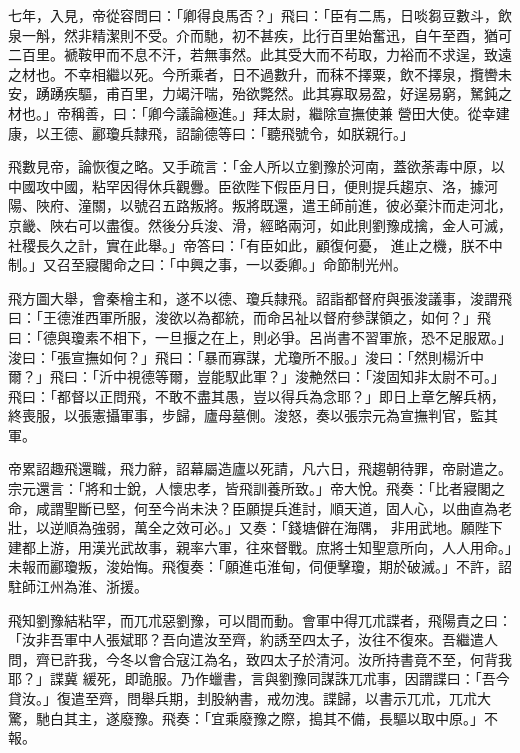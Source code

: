 \begin{pinyinscope}
 七年，入見，帝從容問曰：「卿得良馬否？」飛曰：「臣有二馬，日啖芻豆數斗，飲泉一斛，然非精潔則不受。介而馳，初不甚疾，比行百里始奮迅，自午至酉，猶可二百里。褫鞍甲而不息不汗，若無事然。此其受大而不茍取，力裕而不求逞，致遠之材也。不幸相繼以死。今所乘者，日不過數升，而秣不擇粟，飲不擇泉，攬轡未安，踴踴疾驅，甫百里，力竭汗喘，殆欲斃然。此其寡取易盈，好逞易窮，駑鈍之材也。」帝稱善，曰：「卿今議論極進。」拜太尉，繼除宣撫使兼
 營田大使。從幸建康，以王德、酈瓊兵隸飛，詔諭德等曰：「聽飛號令，如朕親行。」



 飛數見帝，論恢復之略。又手疏言：「金人所以立劉豫於河南，蓋欲荼毒中原，以中國攻中國，粘罕因得休兵觀釁。臣欲陛下假臣月日，便則提兵趨京、洛，據河陽、陜府、潼關，以號召五路叛將。叛將既還，遣王師前進，彼必棄汴而走河北，京畿、陜右可以盡復。然後分兵浚、滑，經略兩河，如此則劉豫成擒，金人可滅，社稷長久之計，實在此舉。」帝答曰：「有臣如此，顧復何憂，
 進止之機，朕不中制。」又召至寢閣命之曰：「中興之事，一以委卿。」命節制光州。



 飛方圖大舉，會秦檜主和，遂不以德、瓊兵隸飛。詔詣都督府與張浚議事，浚謂飛曰：「王德淮西軍所服，浚欲以為都統，而命呂祉以督府參謀領之，如何？」飛曰：「德與瓊素不相下，一旦揠之在上，則必爭。呂尚書不習軍旅，恐不足服眾。」浚曰：「張宣撫如何？」飛曰：「暴而寡謀，尤瓊所不服。」浚曰：「然則楊沂中爾？」飛曰：「沂中視德等爾，豈能馭此軍？」浚艴然曰：「浚固知非太尉不可。」
 飛曰：「都督以正問飛，不敢不盡其愚，豈以得兵為念耶？」即日上章乞解兵柄，終喪服，以張憲攝軍事，步歸，廬母墓側。浚怒，奏以張宗元為宣撫判官，監其軍。



 帝累詔趣飛還職，飛力辭，詔幕屬造廬以死請，凡六日，飛趨朝待罪，帝尉遣之。宗元還言：「將和士銳，人懷忠孝，皆飛訓養所致。」帝大悅。飛奏：「比者寢閣之命，咸謂聖斷已堅，何至今尚未決？臣願提兵進討，順天道，固人心，以曲直為老壯，以逆順為強弱，萬全之效可必。」又奏：「錢塘僻在海隅，
 非用武地。願陛下建都上游，用漢光武故事，親率六軍，往來督戰。庶將士知聖意所向，人人用命。」未報而酈瓊叛，浚始悔。飛復奏：「願進屯淮甸，伺便擊瓊，期於破滅。」不許，詔駐師江州為淮、浙援。



 飛知劉豫結粘罕，而兀朮惡劉豫，可以間而動。會軍中得兀朮諜者，飛陽責之曰：「汝非吾軍中人張斌耶？吾向遣汝至齊，約誘至四太子，汝往不復來。吾繼遣人問，齊已許我，今冬以會合寇江為名，致四太子於清河。汝所持書竟不至，何背我耶？」諜冀
 緩死，即詭服。乃作蠟書，言與劉豫同謀誅兀朮事，因謂諜曰：「吾今貸汝。」復遣至齊，問舉兵期，刲股納書，戒勿洩。諜歸，以書示兀朮，兀朮大驚，馳白其主，遂廢豫。飛奏：「宜乘廢豫之際，搗其不備，長驅以取中原。」不報。




\end{pinyinscope}
